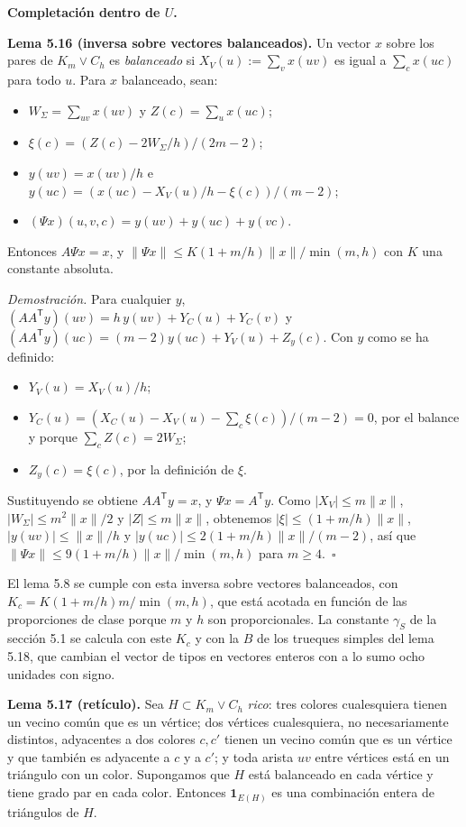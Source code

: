 \documentclass[spanish,11pt,a4paper]{article}
\providecommand{\tightlist}{\setlength{\itemsep}{0pt}\setlength{\parskip}{0pt}}
\begin{document}
\textbf{Completación dentro de \(U\).}

\textbf{Lema 5.16 (inversa sobre vectores balanceados).} Un vector \(x\) sobre los pares de \(K_m\vee C_h\) es \emph{balanceado} si \(X_V(u):=\sum_vx(uv)\) es igual a \(\sum_cx(uc)\) para todo \(u\). Para \(x\) balanceado, sean:

\begin{itemize}
\tightlist
\item
  \(W_\Sigma=\sum_{uv}x(uv)\) y \(Z(c)=\sum_ux(uc)\);
\item
  \(\xi(c)=(Z(c)-2W_\Sigma/h)/(2m-2)\);
\item
  \(y(uv)=x(uv)/h\) e \(y(uc)=(x(uc)-X_V(u)/h-\xi(c))/(m-2)\);
\item
  \((\Psi x)(u,v,c)=y(uv)+y(uc)+y(vc)\).
\end{itemize}

Entonces \(A\Psi x=x\), y \(\|\Psi x\|\le K(1+m/h)\|x\|/\min(m,h)\) con \(K\) una constante absoluta.

\emph{Demostración.} Para cualquier \(y\), \((AA^{\mathsf T}y)(uv)=h\,y(uv)+Y_C(u)+Y_C(v)\) y \((AA^{\mathsf T}y)(uc)=(m-2)y(uc)+Y_V(u)+Z_y(c)\). Con \(y\) como se ha definido:

\begin{itemize}
\tightlist
\item
  \(Y_V(u)=X_V(u)/h\);
\item
  \(Y_C(u)=(X_C(u)-X_V(u)-\sum_c\xi(c))/(m-2)=0\), por el balance y porque \(\sum_cZ(c)=2W_\Sigma\);
\item
  \(Z_y(c)=\xi(c)\), por la definición de \(\xi\).
\end{itemize}

Sustituyendo se obtiene \(AA^{\mathsf T}y=x\), y \(\Psi x=A^{\mathsf T}y\). Como \(|X_V|\le m\|x\|\), \(|W_\Sigma|\le m^2\|x\|/2\) y \(|Z|\le m\|x\|\), obtenemos \(|\xi|\le(1+m/h)\|x\|\), \(|y(uv)|\le\|x\|/h\) y \(|y(uc)|\le2(1+m/h)\|x\|/(m-2)\), así que \(\|\Psi x\|\le9(1+m/h)\|x\|/\min(m,h)\) para \(m\ge4\).~\(\square\)

El lema 5.8 se cumple con esta inversa sobre vectores balanceados, con \(K_c=K(1+m/h)m/\min(m,h)\), que está acotada en función de las proporciones de clase porque \(m\) y \(h\) son proporcionales. La constante \(\gamma_S\) de la sección 5.1 se calcula con este \(K_c\) y con la \(B\) de los trueques simples del lema 5.18, que cambian el vector de tipos en vectores enteros con a lo sumo ocho unidades con signo.

\textbf{Lema 5.17 (retículo).} Sea \(H\subset K_m\vee C_h\) \emph{rico}: tres colores cualesquiera tienen un vecino común que es un vértice; dos vértices cualesquiera, no necesariamente distintos, adyacentes a dos colores \(c,c'\) tienen un vecino común que es un vértice y que también es adyacente a \(c\) y a \(c'\); y toda arista \(uv\) entre vértices está en un triángulo con un color. Supongamos que \(H\) está balanceado en cada vértice y tiene grado par en cada color. Entonces \(\mathbf 1_{E(H)}\) es una combinación entera de triángulos de \(H\).
\end{document}
